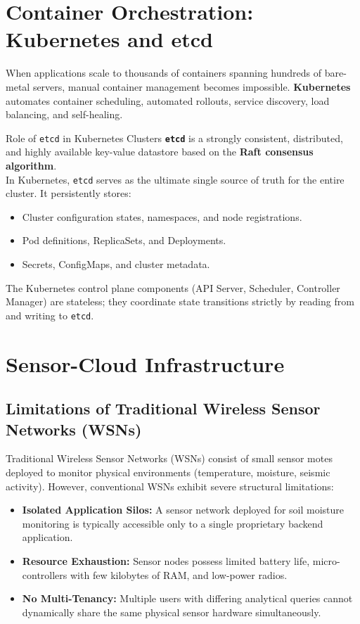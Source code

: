 \section{Container Orchestration: Kubernetes and etcd}
When applications scale to thousands of containers spanning hundreds of bare-metal servers, manual container management becomes impossible. \textbf{Kubernetes} automates container scheduling, automated rollouts, service discovery, load balancing, and self-healing.

\begin{defbox}{Role of \texttt{etcd} in Kubernetes Clusters}
\textbf{\texttt{etcd}} is a strongly consistent, distributed, and highly available key-value datastore based on the \textbf{Raft consensus algorithm}.\\
In Kubernetes, \texttt{etcd} serves as the ultimate single source of truth for the entire cluster. It persistently stores:
\begin{itemize}[leftmargin=*]
  \item Cluster configuration states, namespaces, and node registrations.
  \item Pod definitions, ReplicaSets, and Deployments.
  \item Secrets, ConfigMaps, and cluster metadata.
\end{itemize}
The Kubernetes control plane components (API Server, Scheduler, Controller Manager) are stateless; they coordinate state transitions strictly by reading from and writing to \texttt{etcd}.
\end{defbox}

\section{Sensor-Cloud Infrastructure}
\subsection{Limitations of Traditional Wireless Sensor Networks (WSNs)}
Traditional Wireless Sensor Networks (WSNs) consist of small sensor motes deployed to monitor physical environments (temperature, moisture, seismic activity). However, conventional WSNs exhibit severe structural limitations:
\begin{itemize}[leftmargin=*]
  \item \textbf{Isolated Application Silos:} A sensor network deployed for soil moisture monitoring is typically accessible only to a single proprietary backend application.
  \item \textbf{Resource Exhaustion:} Sensor nodes possess limited battery life, micro-controllers with few kilobytes of RAM, and low-power radios.
  \item \textbf{No Multi-Tenancy:} Multiple users with differing analytical queries cannot dynamically share the same physical sensor hardware simultaneously.
\end{itemize}

